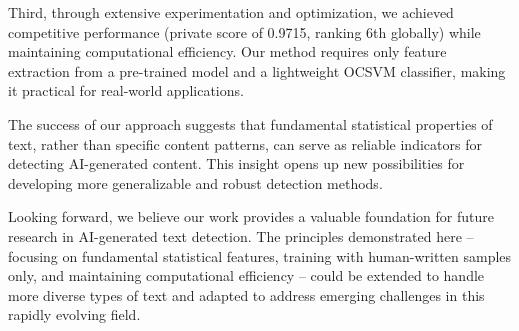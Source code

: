 Third, through extensive experimentation and optimization, we achieved competitive performance (private score of 0.9715, ranking 6th globally) while maintaining computational efficiency. Our method requires only feature extraction from a pre-trained model and a lightweight OCSVM classifier, making it practical for real-world applications.

The success of our approach suggests that fundamental statistical properties of text, rather than specific content patterns, can serve as reliable indicators for detecting AI-generated content. This insight opens up new possibilities for developing more generalizable and robust detection methods.

Looking forward, we believe our work provides a valuable foundation for future research in AI-generated text detection. The principles demonstrated here – focusing on fundamental statistical features, training with human-written samples only, and maintaining computational efficiency – could be extended to handle more diverse types of text and adapted to address emerging challenges in this rapidly evolving field.